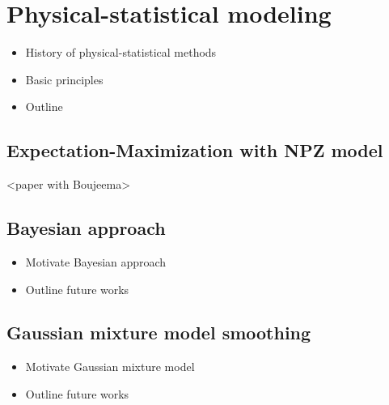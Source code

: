 

\chapter{Physical-statistical modeling}
\label{chapter3}

	\begin{itemize}
		\item History of physical-statistical methods
		\item Basic principles
		\item Outline
	\end{itemize}

	\section{Expectation-Maximization with NPZ model}

		<paper with Boujeema>

	\section{Bayesian approach}

		\begin{itemize}
			\item Motivate Bayesian approach
			\item Outline future works
		\end{itemize}

	\section{Gaussian mixture model smoothing}

		\begin{itemize}
			\item Motivate Gaussian mixture model
			\item Outline future works
		\end{itemize}
